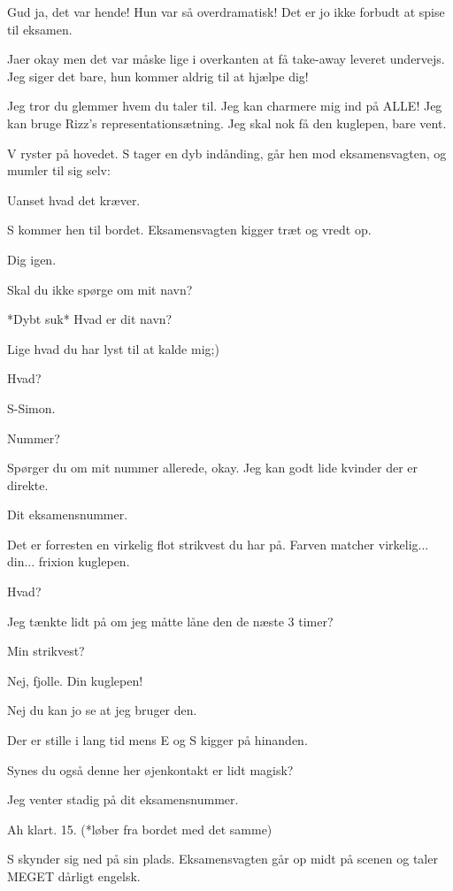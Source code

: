 \documentclass[a4paper,11pt]{article}
\begin{document}
\begin{sketch}
 Gud ja, det var hende! Hun var så overdramatisk! Det er jo ikke forbudt at spise til eksamen.

 Jaer okay men det var måske lige i overkanten at få take-away leveret undervejs. Jeg siger det bare, hun kommer aldrig til at hjælpe dig! 

 Jeg tror du glemmer hvem du taler til. Jeg kan charmere mig ind på ALLE! Jeg kan bruge Rizz's representationsætning. Jeg skal nok få den kuglepen, bare vent. 

\scene V ryster på hovedet. S tager en dyb indånding, går hen mod eksamensvagten, og mumler til sig selv:

 Uanset hvad det kræver. 

\scene S kommer hen til bordet. Eksamensvagten kigger træt og vredt op. 

 Dig igen. 

 Skal du ikke spørge om mit navn?

 *Dybt suk* Hvad er dit navn?

 Lige hvad du har lyst til at kalde mig;)

 Hvad?

 S-Simon.

 Nummer?

 Spørger du om mit nummer allerede, okay. Jeg kan godt lide kvinder der er direkte.

 Dit eksamensnummer.

 Det er forresten en virkelig flot strikvest du har på. Farven matcher virkelig... din... frixion kuglepen.

 Hvad? 

 Jeg tænkte lidt på om jeg måtte låne den de næste 3 timer? 

 Min strikvest? 

 Nej, fjolle. Din kuglepen! 

 Nej du kan jo se at jeg bruger den.

\scene Der er stille i lang tid mens E og S kigger på hinanden. 

 Synes du også denne her øjenkontakt er lidt magisk? 

 Jeg venter stadig på dit eksamensnummer. 

 Ah klart. 15. (*løber fra bordet med det samme) 

\scene S skynder sig ned på sin plads. Eksamensvagten går op midt på scenen og taler MEGET dårligt engelsk. 


\end{sketch}
\end{document}
